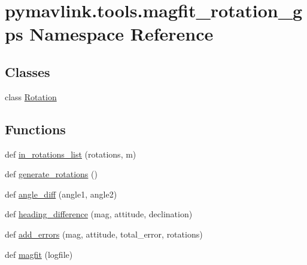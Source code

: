 \hypertarget{namespacepymavlink_1_1tools_1_1magfit__rotation__gps}{}\section{pymavlink.\+tools.\+magfit\+\_\+rotation\+\_\+gps Namespace Reference}
\label{namespacepymavlink_1_1tools_1_1magfit__rotation__gps}
\subsection*{Classes}
\begin{DoxyCompactItemize}
\item 
class \mbox{\hyperlink{classpymavlink_1_1tools_1_1magfit__rotation__gps_1_1Rotation}{Rotation}}
\end{DoxyCompactItemize}
\subsection*{Functions}
\begin{DoxyCompactItemize}
\item 
def \mbox{\hyperlink{namespacepymavlink_1_1tools_1_1magfit__rotation__gps_a603524ffd72ee7855f58c5689c0903c2}{in\+\_\+rotations\+\_\+list}} (rotations, m)
\item 
def \mbox{\hyperlink{namespacepymavlink_1_1tools_1_1magfit__rotation__gps_acb9dbe90061d5435cea646ad6dfa6a75}{generate\+\_\+rotations}} ()
\item 
def \mbox{\hyperlink{namespacepymavlink_1_1tools_1_1magfit__rotation__gps_a497516bc1636ac24a1df1d8d08440dab}{angle\+\_\+diff}} (angle1, angle2)
\item 
def \mbox{\hyperlink{namespacepymavlink_1_1tools_1_1magfit__rotation__gps_a310cbaeb70b1110d0e0c30bb055849c6}{heading\+\_\+difference}} (mag, attitude, declination)
\item 
def \mbox{\hyperlink{namespacepymavlink_1_1tools_1_1magfit__rotation__gps_a07a846988f01406b07262b59f194bc0c}{add\+\_\+errors}} (mag, attitude, total\+\_\+error, rotations)
\item 
def \mbox{\hyperlink{namespacepymavlink_1_1tools_1_1magfit__rotation__gps_a3c0d998ef7946658f7d3085301310b90}{magfit}} (logfile)
\end{DoxyCompactItemize}
